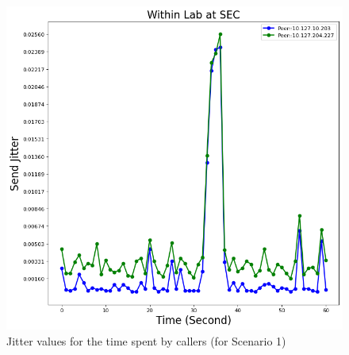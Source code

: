 	\begin{figure}[!b]
		\begin{minipage}{\textwidth}
			\includegraphics[scale=0.38]{Images/experiment/senarios/df_in_lab.png}
		\end{minipage}
		\caption{Jitter values for the time spent by callers (for Scenario 1)}
		\label{fig:scene-out-1}
	\end{figure}


